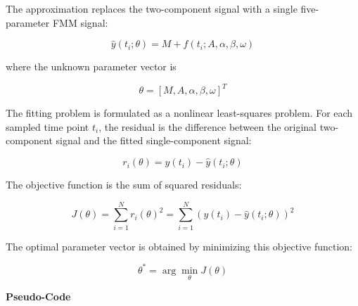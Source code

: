 \documentclass{book}
\providecommand{\ProjectDeepHeading}[2]{%
    \par\medskip\noindent\textbf{#2}\par\smallskip
}
\begin{document}
        The approximation replaces the two-component signal with a single five-parameter FMM signal:
        
        \[
            \hat{y}(t_i; \ensuremath{\theta})
            =
            M
            +
            f(t_i; A,\ensuremath{\alpha},\ensuremath{\beta},\ensuremath{\omega})
        \]
        
        where the unknown parameter vector is
        
        \[
            \ensuremath{\theta}
            =
            \left[
                M,
                A,
                \ensuremath{\alpha},
                \ensuremath{\beta},
                \ensuremath{\omega}
            \right]^{T}
        \]
        
        The fitting problem is formulated as a nonlinear least-squares problem. For each sampled time point \(t_i\), the residual is the difference between the original two-component signal and the fitted single-component signal:
        
        \[
            r_i(\ensuremath{\theta})
            =
            y(t_i)
            -
            \hat{y}(t_i; \ensuremath{\theta})
        \]
        
        The objective function is the sum of squared residuals:
        
        \[
            J(\ensuremath{\theta})
            =
            \sum_{i=1}^{N}
            r_i(\ensuremath{\theta})^2
            =
            \sum_{i=1}^{N}
            \left(
                y(t_i)
                -
                \hat{y}(t_i; \ensuremath{\theta})
            \right)^2
        \]
        
        The optimal parameter vector is obtained by minimizing this objective function:
        
        \[
            \ensuremath{\theta}^{*}
            =
            \arg\min_{\ensuremath{\theta}}
            J(\ensuremath{\theta})
        \]
    
    
    \ProjectDeepHeading{11}{Pseudo-Code}
        
\end{document}
